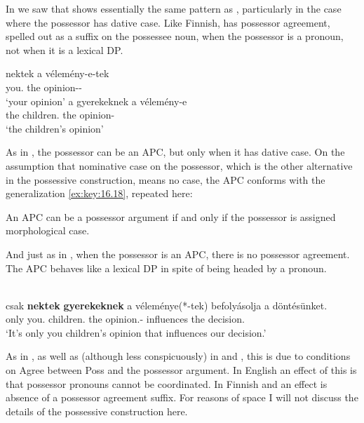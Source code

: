 \documentclass[output=paper]{langsci/langscibook}
\begin{document}
In  we saw that  shows essentially the same pattern
as , particularly in the case where the possessor has dative case. Like
Finnish,  has possessor agreement, spelled out as a suffix on the
possessee noun, when the possessor is a pronoun, not when it is a lexical DP.

\ea\label{ex:key:16.46}
   	\ea
		\gll nektek    a    vélemény-e-tek\\
		        you.\Dat{} the opinion-\Poss-\Spl{}\\
	    \glt `your opinion'
	\ex
		\gll a    gyerekeknek    a    vélemény-e\\
			the children.\Dat{} the opinion-\Poss{}\\
		\glt `the children's opinion'
	\z
\z

As in , the possessor can be an \gls{APC}, but only when it has dative case.
On the assumption that nominative case on the possessor,
which is the other alternative in the  possessive construction, means
no case,  the  \gls{APC} conforms with the generalization
\eqref{ex:key:16.18}, repeated here:

\ea\label{ex:key:16.47}
    An \gls{APC} can be a possessor argument if and only if the possessor is assigned
    morphological case.
\z

And just as in , when the possessor is an \gls{APC}, there is no possessor
agreement. The \gls{APC} behaves like a lexical DP in spite of being headed by
a pronoun.\newpage

\ea\label{ex:key:16.48}\\
    \gll   {}csak \textbf{nektek} \textbf{gyerekeknek} a véleménye(*-tek) befolyásolja a döntésünket.\\
            only you.\Dat{} children.\Dat{} the opinion.\Poss{}-\Spl{} influences the decision.\Acc{}\\
    \glt    `It's only you children's opinion that influences our decision.'
\z

As in , as well as (although less conspicuously) in  and ,
this is due to conditions on Agree between Poss and the possessor argument. In
English an effect of this is that possessor pronouns cannot be coordinated. In
Finnish and  an effect is absence of a possessor agreement suffix. For
reasons of space I will not discuss the details of the  possessive
construction here.
\end{document}
